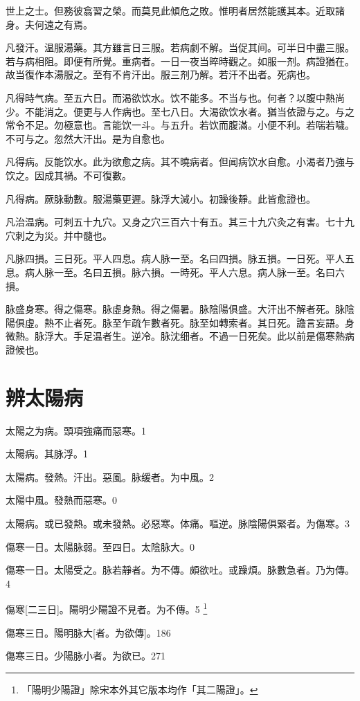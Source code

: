 \documentclass[11pt,oneside,b5paper]{ctexbook}
\begin{document}
\begin{flushleft}
世上之士。但務彼翕習之榮。而莫見此傾危之敗。惟明者居然能護其本。近取諸身。夫何遠之有焉。

凡發汗。温服湯藥。其方雖言日三服。若病劇不解。当促其间。可半日中盡三服。若与病相阻。即便有所覺。重病者。一日一夜当晬時觀之。如服一剂。病證猶在。故当復作本湯服之。至有不肯汗出。服三剂乃解。若汗不出者。死病也。

凡得時气病。至五六日。而渴欲饮水。饮不能多。不当与也。何者？以腹中熱尚少。不能消之。便更与人作病也。至七八日。大渴欲饮水者。猶当依證与之。与之常令不足。勿極意也。言能饮一斗。与五升。若饮而腹滿。小便不利。若喘若噦。不可与之。忽然大汗出。是为自愈也。

凡得病。反能饮水。此为欲愈之病。其不曉病者。但闻病饮水自愈。小渴者乃強与饮之。因成其禍。不可復數。

凡得病。厥脉動數。服湯藥更遲。脉浮大減小。初躁後靜。此皆愈證也。

凡治温病。可刺五十九穴。又身之穴三百六十有五。其三十九穴灸之有害。七十九穴刺之为災。并中髓也。

凡脉四損。三日死。平人四息。病人脉一至。名曰四損。脉五損。一日死。平人五息。病人脉一至。名曰五損。脉六損。一時死。平人六息。病人脉一至。名曰六損。

脉盛身寒。得之傷寒。脉虛身熱。得之傷暑。脉陰陽俱盛。大汗出不解者死。脉陰陽俱虛。熱不止者死。脉至乍疏乍數者死。脉至如轉索者。其日死。譫言妄語。身微熱。脉浮大。手足温者生。逆冷。脉沈细者。不過一日死矣。此以前是傷寒熱病證候也。

\chapter{辨太陽病}

太陽之为病。頭項強痛而惡寒。1

太陽病。其脉浮。1

太陽病。發熱。汗出。惡風。脉缓者。为中風。2

太陽中風。發熱而惡寒。0

太陽病。或已發熱。或未發熱。必惡寒。体痛。嘔逆。脉陰陽俱緊者。为傷寒。3

傷寒一日。太陽脉弱。至四日。太陰脉大。0

傷寒一日。太陽受之。脉若靜者。为不傳。頗欲吐。或躁煩。脉數急者。乃为傳。4

傷寒[二三日]。陽明少陽證不見者。为不傳。5
\footnote{「陽明少陽證」除宋本外其它版本均作「其二陽證」。}

傷寒三日。陽明脉大[者。为欲傳]。186

傷寒三日。少陽脉小者。为欲已。271


\end{flushleft}
\end{document}
